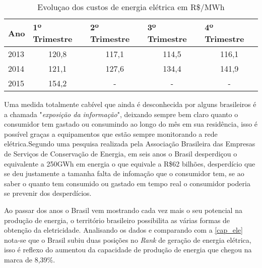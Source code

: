 \begin{table}[!ht]
	\centering
	\begin{tabular}{lcccc}
	\hline
	\textbf{Ano} & \multicolumn{1}{l}{\textbf{1º Trimestre}} & \multicolumn{1}{l}{\textbf{2º Trimestre}} & \multicolumn{1}{l}{\textbf{3º Trimestre}} & \multicolumn{1}{l}{\textbf{4º Trimestre}} \\ \hline
	\rowcolor[HTML]{DDDDDD} 
	2013         & 120,8                                     & 117,1                                     & 114,5                                     & 116,1                                     \\
	2014         & 121,1                                     & 127,6                                     & 134,4                                     & 141,9                                     \\
	\rowcolor[HTML]{DDDDDD} 
	2015         & 154,2                                     & -                                         & -                                         & -                                        
	\end{tabular}
	\caption{Evoluçao dos custos de energia elétrica em R\$/MWh}
	\label{evolucao-tarifa}
\end{table}

Uma medida totalmente cabível que ainda é desconhecida por alguns brasileiros é a chamada "\textit{exposição da informação}", deixando sempre bem claro 
quanto o consumidor tem gastado ou consumindo ao longo do mês em sua residência, isso é possível graças a equipamentos que estão sempre monitorando
a rede elétrica.Segundo uma pesquisa realizada pela Associação Brasileira das Empresas de Serviços de Conservação de Energia, em seis anos o Brasil 
desperdiçou o equivalente a 250GWh em energia o que equivale a R\$62 bilhões, desperdício que se deu justamente a tamanha falta de infomação que 
o consumidor tem, se ao saber o quanto tem consumido ou gastado em tempo real o consumidor poderia se prevenir dos desperdícios. 


Ao passar dos anos o Brasil vem mostrando cada vez mais o seu potencial na produção de energia, o território brasileiro possibilita as várias formas
de obtenção da eletricidade. Analisando os dados \cite[p.29]{epe-anuario-2015} e comparando com a \autoref{cap_ele} nota-se que o Brasil subiu duas
posições no \textit{Rank} de geração de energia elétrica, isso é reflexo do aumentou da capacidade de produção de energia que chegou na marca de 8,39\%.

